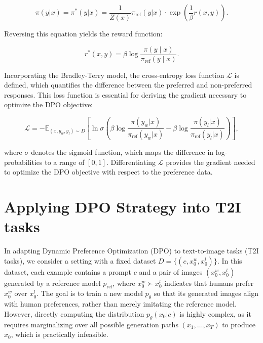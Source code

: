 \begin{equation}
\pi(y | x) = \pi^*(y | x) = \frac{1}{Z(x)} \pi_{\text{ref}}(y | x) \cdot \exp \left( \frac{1}{\beta} r(x, y) \right).
\end{equation}

Reversing this equation yields the reward function:

\begin{equation}
r^*(x, y) = \beta \log \frac{\pi(y \mid x)}{\pi_{\text{ref}}(y \mid x)}.
\end{equation}

Incorporating the Bradley-Terry model, the cross-entropy loss function \(\mathcal{L}\) is defined, which quantifies the difference between the preferred and non-preferred responses. This loss function is essential for deriving the gradient necessary to optimize the DPO objective:

\begin{equation}
\mathcal{L} = -\mathbb{E}_{(x, y_w, y_l) \sim D} \left[ \ln \sigma \left( \beta \log \frac{\pi(y_w | x)}{\pi_{\text{ref}}(y_w | x)} - \beta \log \frac{\pi(y_l | x)}{\pi_{\text{ref}}(y_l | x)} \right) \right],
\end{equation}

where \( \sigma \) denotes the sigmoid function, which maps the difference in log-probabilities to a range of \([0, 1]\). Differentiating \(\mathcal{L}\) provides the gradient needed to optimize the DPO objective with respect to the preference data.


\section{Applying DPO Strategy into T2I tasks}

In adapting Dynamic Preference Optimization (DPO) to text-to-image tasks (T2I tasks), we consider a setting with a fixed dataset \( D = \{(c, x_0^w, x_0^l)\} \). In this dataset, each example contains a prompt \( c \) and a pair of images \( (x_0^w, x_0^l) \) generated by a reference model \( p_{\text{ref}} \), where \( x_0^w \succ x_0^l \) indicates that humans prefer \( x_0^w \) over \( x_0^l \). The goal is to train a new model \( p_\theta \) so that its generated images align with human preferences, rather than merely imitating the reference model. However, directly computing the distribution \( p_\theta(x_0 | c) \) is highly complex, as it requires marginalizing over all possible generation paths \( (x_1, \ldots, x_T) \) to produce \( x_0 \), which is practically infeasible.

